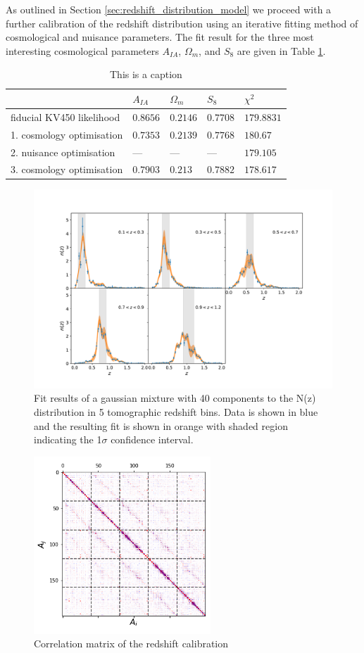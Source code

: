 \documentclass{aa}
\begin{document}
As outlined in Section \ref{sec:redshift_distribution_model} we proceed with a further calibration of the redshift distribution using an iterative fitting method of cosmological and nuisance parameters. The fit result for the three most interesting cosmological parameters $A_{IA}$, $\Omega_m$, and $S_8$ are given in Table \ref{tab:iterative_calibration}. 
\begin{table}
\begin{tabular}{lllll}
& $A_{IA}$ & $\Omega_m$ & $S_8$ & $\chi^2$\\
\hline
\hline
fiducial KV450 likelihood & $0.8656$ & $0.2146$ & $0.7708$ & $179.8831$\\
\hline
1. cosmology optimisation & $0.7353$ & $0.2139$ & $0.7768$ & $180.67$\\
2. nuisance optimisation & --- & --- & --- & $179.105$\\
3. cosmology optimisation & $0.7903$ & $0.213$ & $0.7882$ & $178.617$\\
\end{tabular}
\caption{{\color{red} This is a caption}}
\label{tab:iterative_calibration}
\end{table}
\begin{figure}
\centering
\includegraphics[scale=0.3]{plots/combfit_linear.pdf}
\caption{Fit results of a gaussian mixture with 40 components to the N(z) distribution in 5 tomographic redshift bins. Data is shown in blue and the resulting fit is shown in orange with shaded region indicating the 1$\sigma$ confidence interval.}
\label{fig:comb}
\end{figure}
\begin{figure}
\centering
\includegraphics[scale=0.7]{plots/corr.png}
\caption{Correlation matrix of the redshift calibration}
\label{fig:correlation_matrix}
\end{figure}
\end{document}
